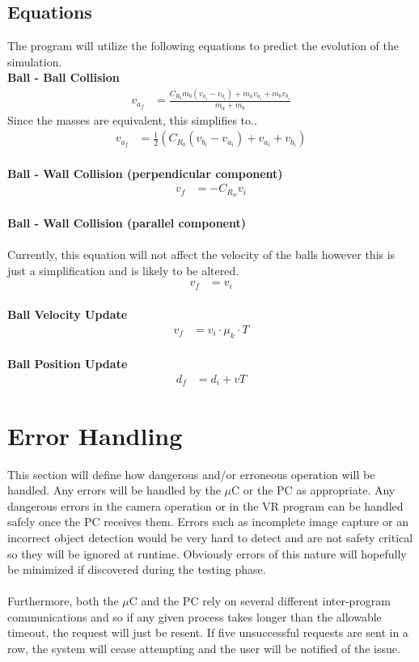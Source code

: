 \documentclass[titlepage]{article}
\begin{document}
\subsection{Equations}
The program will utilize the following equations to predict the evolution of the simulation.\\[4mm]
\textbf{Ball - Ball Collision}\\
{\large
\begin{align*}
	v_{a_f}	&= \frac{C_{R_b}m_b(v_{a_i} - v_{b_i}) + m_av_{a_i} + m_bv_{b_i}}{m_a + m_b}
\end{align*}
}
Since the masses are equivalent, this simplifies to..
{\large
\begin{align}
	v_{a_f}	&= \frac{1}{2}(C_{R_b}(v_{b_i} - v_{a_i}) + v_{a_i} + v_{b_i})
\end{align}
}\\
\textbf{Ball - Wall Collision (perpendicular component)}
{\large
\begin{align}
	v_f	&= -C_{R_w}v_i
\end{align}
}\\
\textbf{Ball - Wall Collision (parallel component)}
{\large\\~\\[-2mm]
Currently, this equation will not affect the velocity of the balls however this is just a simplification and is likely to be altered.
\begin{align}
	v_f	&= v_i
\end{align}
}\\
\textbf{Ball Velocity Update}
{\large
\begin{align}
	v_f	&= v_i \cdot \mu_k \cdot T
\end{align}
}\\
\textbf{Ball Position Update}
{\large
\begin{align}
	d_f	&= d_i + vT
\end{align}
}



\section{Error Handling}
This section will define how dangerous and/or erroneous operation will be handled. Any errors will be handled by the $\mu$C or the PC as appropriate. Any dangerous errors in the camera operation or in the VR program can be handled safely once the PC receives them. Errors such as incomplete image capture or an incorrect object detection would be very hard to detect and are not safety critical so they will be ignored at runtime. Obviously errors of this nature will hopefully be minimized if discovered during the testing phase.\\~\\
Furthermore, both the $\mu$C and the PC rely on several different inter-program communications and so if any given process takes longer than the allowable timeout, the request will just be resent. If five unsuccessful requests are sent in a row, the system will cease attempting and the user will be notified of the issue.
\end{document}
